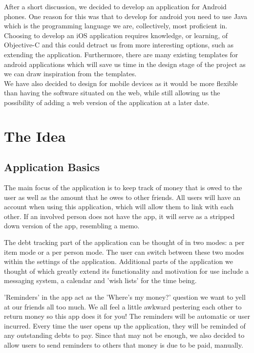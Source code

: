 \documentclass[a4paper,9t]{article}
\begin{document}
After a short discussion, we decided to develop an application for Android phones. One reason for this was that to develop for android you need to use Java which is the programming language we are, collectively, most proficient in. Choosing to develop an iOS application requires knowledge, or learning, of Objective-C and this could detract us from more interesting options, such as extending the application. Furthermore, there are many existing templates for android applications which will save us time in the design stage of the project as we can draw inspiration from the templates. \\
We have also decided to design for mobile devices as it would be more flexible than having the software situated on the web, while still allowing us the possibility of adding a web version of the application at a later date.

\section*{The Idea}

\subsection*{Application Basics}
The main focus of the application is to keep track of money that is owed to the user as well as the amount that he owes to other friends. All users will have an account when using this application, which will allow them to link with each other. If an involved person does not have the app, it will serve as a stripped down version of the app, resembling a memo.

The debt tracking part of the application can be thought of in two modes: a per item mode or a per person mode. The user can switch between these two modes within the settings of the application.  
Additional parts of the application we thought of which greatly extend its functionality and motivation for use include a messaging system, a calendar and 'wish lists' for the time being. 

'Reminders' in the app act as the 'Where's my money?' question we want to yell at our friends all too much. We all feel a little awkward pestering each other to return money so this app does it for you!
The reminders will be automatic or user incurred. Every time the user opens up the application, they will be reminded of any outstanding debts to pay. Since that may not be enough, we also decided to allow users to send reminders to others that money is due to be paid, manually. 
\end{document}
